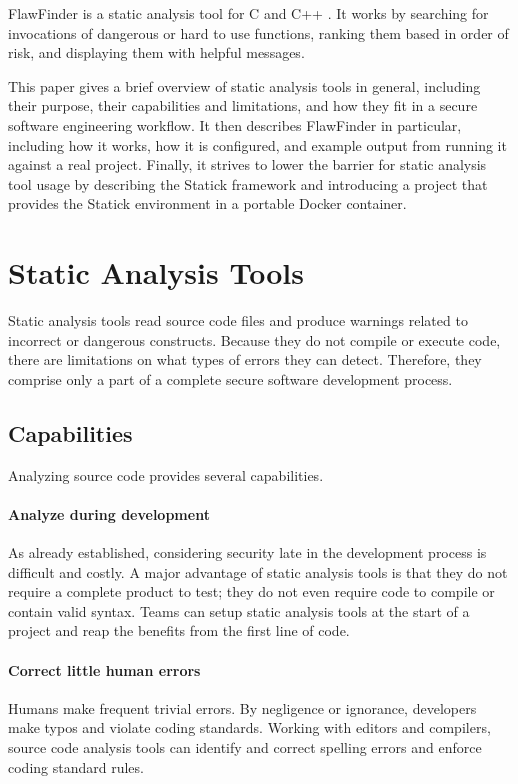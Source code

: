 \documentclass[journal]{IEEEtran}
\begin{document}
FlawFinder is a static analysis tool for C and C++ \cite{flawfinder}. It works by searching for
invocations of dangerous or hard to use functions, ranking them based in order of risk, and
displaying them with helpful messages.

This paper gives a brief overview of static analysis tools in general, including their purpose,
their capabilities and limitations, and how they fit in a secure software engineering workflow. It
then describes FlawFinder in particular, including how it works, how it is configured, and example
output from running it against a real project. Finally, it strives to lower the barrier for static
analysis tool usage by describing the Statick framework and introducing a project that provides the
Statick environment in a portable Docker container.


\section{Static Analysis Tools}

Static analysis tools read source code files and produce warnings related to incorrect or dangerous
constructs. Because they do not compile or execute code, there are limitations on what types of
errors they can detect. Therefore, they comprise only a part of a complete secure software
development process.

\subsection{Capabilities}

Analyzing source code provides several capabilities.

\paragraph{Analyze during development} As already established, considering security late in the
development process is difficult and costly. A major advantage of static analysis tools is that they
do not require a complete product to test; they do not even require code to compile or contain valid
syntax. Teams can setup static analysis tools at the start of a project and reap the benefits from
the first line of code.

\paragraph{Correct little human errors} Humans make frequent trivial errors. By negligence or
ignorance, developers make typos and violate coding standards. Working with editors and compilers,
source code analysis tools can identify and correct spelling errors and enforce coding standard
rules.
\end{document}
